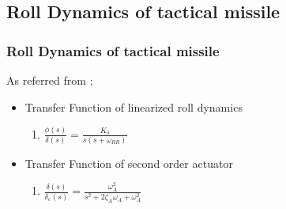 \documentclass[table,10pt,red]{beamer}	%
\begin{document}
\subsection{Roll Dynamics of tactical missile}
	\begin{frame}
	\frametitle{Roll Dynamics of tactical missile}
	As referred from \cite{talole2011};
 	\begin{itemize}  %
		\item Transfer Function of linearized roll dynamics
		\begin{enumerate}
				\item  $\frac{\phi(s)}{\delta(s)} = \frac{K_{\delta}}{s(s + \omega_{RR})}$
 		\end{enumerate}
		\end{itemize}
	\begin{itemize}
		\item  Transfer Function of second order actuator
			\begin{enumerate}
			 \item $\frac{\delta(s)}{\delta_c(s)} = \frac{\omega_A^2}{s^2 + 2\zeta_A\omega_A + \omega_A^2}$
			\end{enumerate}
	\end{itemize}

	\end{frame}
\end{document}
